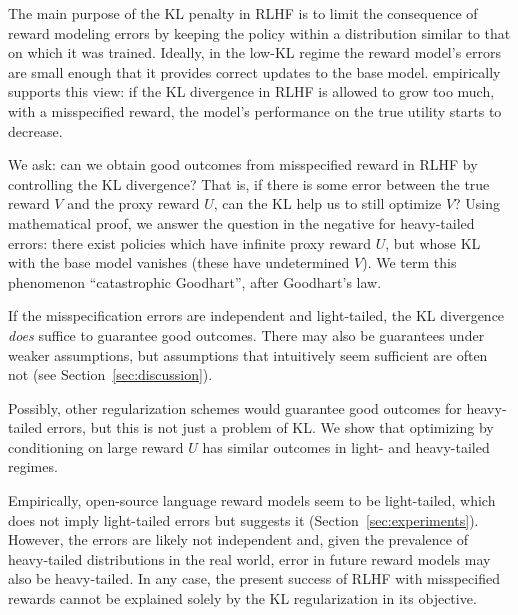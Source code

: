 \documentclass{article}
\begin{document}
The main purpose of the KL penalty in RLHF is to limit the consequence of reward modeling errors by keeping the policy within a distribution similar to that on which it was trained. Ideally, in the low-KL regime the reward model's errors are small enough that it provides correct updates to the base model.  empirically supports this view: if the KL divergence in RLHF is allowed to grow too much, with a misspecified reward, the model's performance on the true utility starts to decrease.

We ask: can we obtain good outcomes from misspecified reward in RLHF by controlling the KL divergence? That is, if there is some error between the true reward $V$ and the proxy reward $U$, can the KL help us to still optimize $V$? Using mathematical proof, we answer the question in the negative for heavy-tailed errors: there exist policies which have infinite proxy reward $U$, but whose KL with the base model vanishes (these have undetermined $V$).  We term this phenomenon ``catastrophic Goodhart'', after Goodhart's law.

If the misspecification errors are independent and light-tailed, the KL divergence \emph{does} suffice to guarantee good outcomes. There may also be 
 guarantees under weaker assumptions, but assumptions that intuitively seem sufficient are often not (see Section~\ref{sec:discussion}).

Possibly, other regularization schemes would guarantee good outcomes for heavy-tailed errors, but this is not just a problem of KL. We show that optimizing by conditioning on large reward $U$ has similar outcomes in light- and heavy-tailed regimes.

Empirically, open-source language reward models seem to be light-tailed, which does not imply light-tailed errors but suggests it (Section~\ref{sec:experiments}). However, the errors are likely not independent and, given the prevalence of heavy-tailed distributions in the real world, error in future reward models may also be heavy-tailed. In any case, the present success of RLHF with misspecified rewards cannot be explained solely by the KL regularization in its objective.

\end{document}

